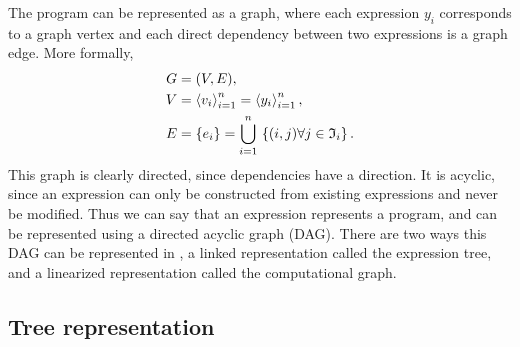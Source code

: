 The program can be represented as a graph, where each expression $y_i$
corresponds to a graph vertex and each direct dependency between two
expressions is a graph edge. More formally,
\begin{align}
G &= (V, E), \label{ufl:eq:G} \\
V &= \left\langle{v_i}\right\rangle_{i=1}^n = \left\langle{y_i}\right\rangle_{i=1}^n, \label{ufl:eq:V} \\
E &= \{ e_i \} = \bigcup_{i=1}^n \, \left\{ (i, j) \forall j \in \mathfrak{I}_i \right\} . \label{ufl:eq:E}
\end{align}
This graph is clearly directed, since dependencies have a direction.
It is acyclic, since an expression can only be constructed from
existing expressions and never be modified.  Thus we can say that an
\ufl{} expression represents a program, and can be represented using a
directed acyclic graph (DAG).  There are two ways this DAG can be
represented in \ufl{}, a linked representation called the expression
tree, and a linearized representation called the computational graph.

\subsection{Tree representation}

